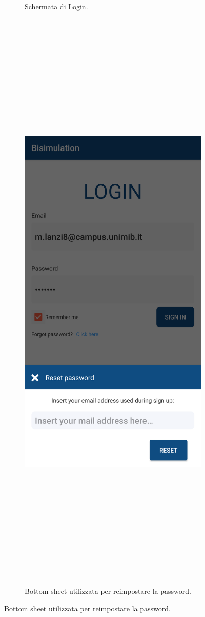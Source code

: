 \documentclass[a4paper,11pt,twoside,openright]{report}
\begin{document}
\begin{figure}[h]
\begin{subfigure}{.5\textwidth}
  \caption{Schermata di Login.}
\end{subfigure}%
\begin{subfigure}{.5\textwidth}
  \centering
  \includegraphics[width=.4\linewidth,height=860pt,keepaspectratio]{images/BottomSheet.png}
  \caption{Bottom sheet utilizzata per reimpostare la password.}
\end{subfigure}
\end{figure}
\end{document}
